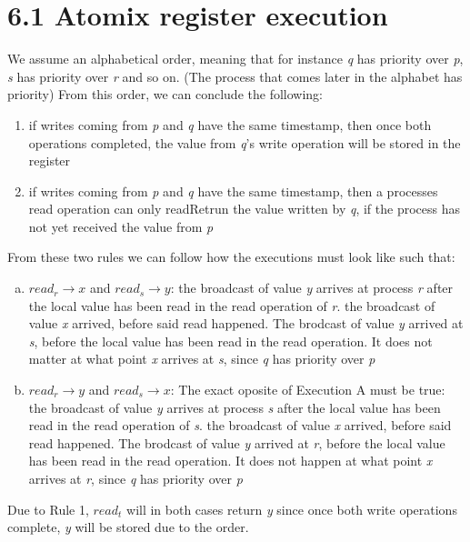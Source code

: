 \documentclass{article}
\begin{document}
	\pagestyle{fancy}
	
    	\section*{6.1 Atomix register execution}
    	We assume an alphabetical order, meaning that for instance \textit{q} has priority over \textit{p}, \textit{s} has priority over \textit{r} and so on. (The process that comes later in the alphabet has priority)
	From this order, we can conclude the following:
	\begin{enumerate}
		\item if writes coming from \textit{p} and \textit{q} have the same timestamp, then once both operations completed, the value from \textit{q}'s write operation will be stored in the register
		\item if writes coming from \textit{p} and \textit{q} have the same timestamp, then a processes read operation can only readRetrun the value written by \textit{q}, if the process has not yet received the value from \textit{p}
	\end{enumerate}
	From these two rules we can follow how the executions must look like such that:
	\begin{enumerate}[a)]
		\item $\textit{read}_r \rightarrow \textit{x}$ and $\textit{read}_s \rightarrow \textit{y}$: the broadcast of value \textit{y} arrives at process \textit{r} after the local value has been read in the read operation of \textit{r}. the broadcast of value 			\textit{x} arrived, before said read happened. The brodcast of value \textit{y} arrived at \textit{s}, before the local value has been read in the read operation. It does not matter at what point \textit{x} arrives at \textit{s}, since \textit{q} has 				priority over \textit{p}
		\item $\textit{read}_r \rightarrow \textit{y}$ and $\textit{read}_s \rightarrow \textit{x}$: The exact oposite of Execution A must be true: 
		 the broadcast of value \textit{y} arrives at process \textit{s} after the local value has been read in the read operation of \textit{s}. the broadcast of value \textit{x} arrived, before said read happened. The brodcast of value \textit{y} arrived at 			\textit{r}, before the local value has been read in the read operation. It does not happen at what point \textit{x} arrives at \textit{r}, since \textit{q} has priority over \textit{p}
	\end{enumerate}

	Due to Rule 1, $\textit{read}_t$ will in both cases return \textit{y} since once both write operations complete, \textit{y} will be stored due to the order.
\end{document}
